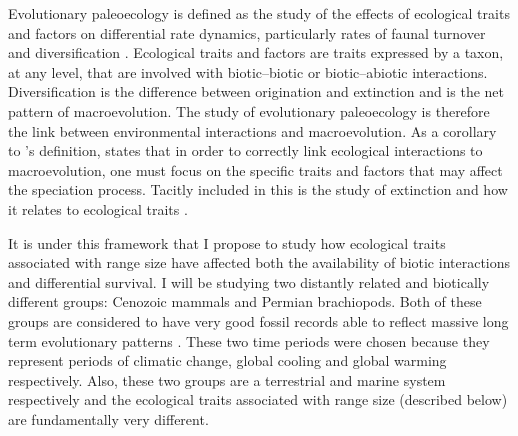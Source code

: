 \documentclass[12pt,letterpaper]{article}
\begin{document}
Evolutionary paleoecology is defined as the study of the effects of ecological traits and factors on differential rate dynamics, particularly rates of faunal turnover and diversification \citep{Kitchell1985a}. Ecological traits and factors are traits expressed by a taxon, at any level, that are involved with biotic--biotic or biotic--abiotic interactions. Diversification is the difference between origination and extinction and is the net pattern of macroevolution. The study of evolutionary paleoecology is therefore the link between environmental interactions and macroevolution. As a corollary to \citet{Kitchell1985a}'s definition, \citet{Allmon1994} states that in order to correctly link ecological interactions to macroevolution, one must focus on the specific traits and factors that may affect the speciation process. Tacitly included in this is the study of extinction and how it relates to ecological traits \citep{Kitchell1990}.


It is under this framework that I propose to study how ecological traits associated with range size have affected both the availability of biotic interactions and differential survival. I will be studying two distantly related and biotically different groups: Cenozoic mammals and Permian brachiopods. Both of these groups are considered to have very good fossil records able to reflect massive long term evolutionary patterns \citep{Mark1977}. These two time periods were chosen because they represent periods of climatic change, global cooling and global warming respectively. Also, these two groups are a terrestrial and marine system respectively and the ecological traits associated with range size (described below) are fundamentally very different. 

\end{document}
